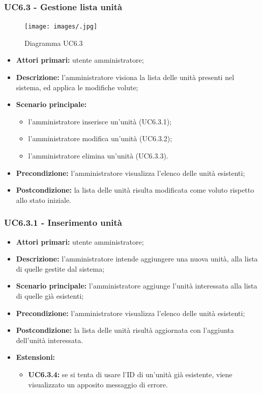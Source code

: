 \subsubsection{UC6.3 - Gestione lista unità}
	\begin{center}
		\begin{figure}[h!]
			\texttt{[image: images/.jpg]}
			\caption{Diagramma UC6.3}
		\end{figure}
	\end{center}
	\begin{itemize}
		\item \textbf{Attori primari:} utente amministratore;
		\item \textbf{Descrizione:} l'amministratore visiona la lista delle unità presenti nel sistema, ed applica le modifiche volute;
		\item \textbf{Scenario principale:} 
			\begin{itemize}
				\item l'amministratore inserisce un'unità (UC6.3.1);
				\item l'amministratore modifica un'unità (UC6.3.2);
				\item l'amministratore elimina un'unità (UC6.3.3).
			\end{itemize}
		\item \textbf{Precondizione:} l'amministratore visualizza l'elenco delle unità esistenti;
		\item \textbf{Postcondizione:} la lista delle unità risulta modificata come voluto rispetto allo stato iniziale.
	\end{itemize}

\subsubsection{UC6.3.1 - Inserimento unità}
\begin{itemize}
	\item \textbf{Attori primari:} utente amministratore;
	\item \textbf{Descrizione:} l'amministratore intende aggiungere una nuova unità, alla lista di quelle gestite dal sistema;
	\item \textbf{Scenario principale:} l'amministratore aggiunge l'unità interessata alla lista di quelle già esistenti;
	\item \textbf{Precondizione:} l'amministratore visualizza l'elenco delle unità esistenti;
	\item \textbf{Postcondizione:} la lista delle unità risultà aggiornata con l'aggiunta dell'unità interessata.
	\item \textbf{Estensioni:}
	\begin{itemize}
		\item \textbf{UC6.3.4:} se si tenta di usare l'ID di un'unità già esistente, viene visualizzato un apposito messaggio di errore.
	\end{itemize}
\end{itemize}

